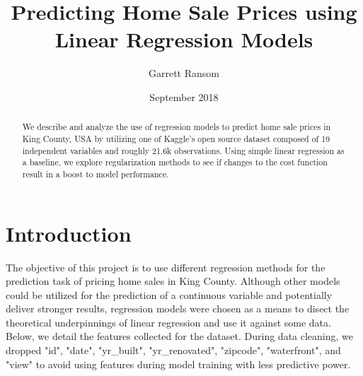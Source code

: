 \documentclass[11pt, letterpaper]{article}
\title{Predicting Home Sale Prices using Linear Regression Models}
\author{Garrett Ransom}
\date{September 2018}
\begin{document}
\maketitle
\begin{abstract}
\noindent
We describe and analyze the use of regression models to predict home sale prices in King County, USA by utilizing one of Kaggle's open source dataset composed of 19 independent variables and roughly 21.6k observations. Using simple linear regression as a baseline, we explore regularization methods to see if changes to the cost function result in a boost to model performance. 
\end{abstract}

\section{Introduction}
The objective of this project is to use different regression methods for the prediction task of pricing home sales in King County. Although other models could be utilized for the prediction of a continuous variable and potentially deliver stronger results, regression models were chosen as a means to disect the theoretical underpinnings of linear regression and use it against some data. Below, we detail the features collected for the dataset. During data cleaning, we dropped "id", "date", "yr\_built", "yr\_renovated", "zipcode", "waterfront", and "view" to avoid using features during model training with less predictive power.
\end{document}
